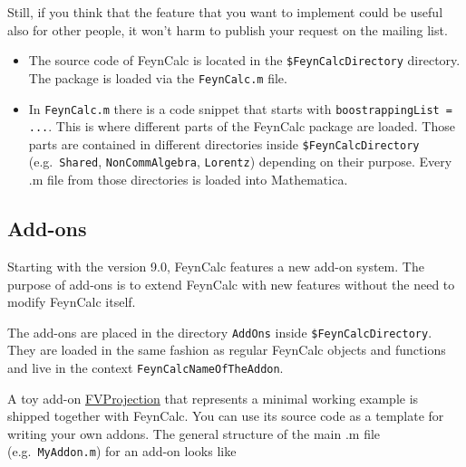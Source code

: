 \documentclass[../FeynCalcManual.tex]{subfiles}
\begin{document}
Still, if you think that the feature that you want to implement could be
useful also for other people, it won't harm to publish your request on
the mailing list.

\begin{itemize}
\tightlist
\item
  The source code of FeynCalc is located in the
  \texttt{\$FeynCalcDirectory} directory. The package is loaded via the
  \texttt{FeynCalc.m} file.
\item
  In \texttt{FeynCalc.m} there is a code snippet that starts with
  \texttt{boostrappingList = ...}. This is where different parts of the
  FeynCalc package are loaded. Those parts are contained in different
  directories inside \texttt{\$FeynCalcDirectory} (e.g.~\texttt{Shared},
  \texttt{NonCommAlgebra}, \texttt{Lorentz}) depending on their purpose.
  Every .m file from those directories is loaded into Mathematica.
\end{itemize}

\subsection{Add-ons}\label{add-ons}

Starting with the version 9.0, FeynCalc features a new add-on system.
The purpose of add-ons is to extend FeynCalc with new features without
the need to modify FeynCalc itself.

The add-ons are placed in the directory \texttt{AddOns} inside
\texttt{\$FeynCalcDirectory}. They are loaded in the same fashion as
regular FeynCalc objects and functions and live in the context
\texttt{FeynCalc\textasciigrave NameOfTheAddon\textasciigrave }.

A toy add-on
\href{https://github.com/FeynCalc/feyncalc/tree/master/FeynCalc/AddOns/FVProjection}{FVProjection}
that represents a minimal working example is shipped together with
FeynCalc. You can use its source code as a template for writing your own
addons. The general structure of the main .m file
(e.g.~\texttt{MyAddon.m}) for an add-on looks like
\end{document}

